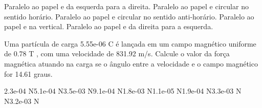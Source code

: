 \documentclass[12pt, addpoints]{exam}
\begin{document}
\begin{questions}
\begin{multicols*}{2}
        

\begin{choices}
\choice Paralelo ao papel e da esquerda para a direita. 
\choice Paralelo ao papel e circular no sentido horário. 
\choice Paralelo ao papel e circular no sentido anti-horário. 
\choice Paralelo ao papel e na vertical. 
\choice Paralelo ao papel e da direita para a esquerda. 
\end{choices}
\question Uma partícula de carga 5.55e-06 C é lançada em um campo magnético uniforme de    0.78 T , com uma velocidade de 831.92 m/s. Calcule o valor da força magnética atuando na carga se o ângulo entre a velocidade e o campo magnético for   14.61 graus.

\begin{oneparchoices}
\choice 2.3e-04 N\choice 5.1e-04 N\choice 3.5e-03 N\choice 9.1e-04 N\choice 1.8e-03 N\choice 1.1e-05 N\choice 1.9e-04 N\choice 3.3e-03 N N\choice 3.2e-03 N
\end{oneparchoices}\end{multicols*}
\end{questions}
\newpage
\end{document}

